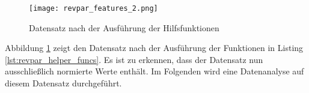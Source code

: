 \begin{figure}[h]
    \centering
    \texttt{[image: revpar\_features\_2.png]}
    \caption[Datensatz nach der Ausführung der Hilfsfunktionen]{Datensatz nach der Ausführung der Hilfsfunktionen}
    \label{img:revpar_features_2}
\end{figure}

Abbildung \ref{img:revpar_features_2} zeigt den Datensatz nach der Ausführung der Funktionen in Listing \ref{lst:revpar_helper_funcs}. Es ist zu erkennen, dass der Datensatz nun ausschließlich normierte Werte enthält. Im Folgenden wird eine Datenanalyse auf diesem Datensatz durchgeführt.
